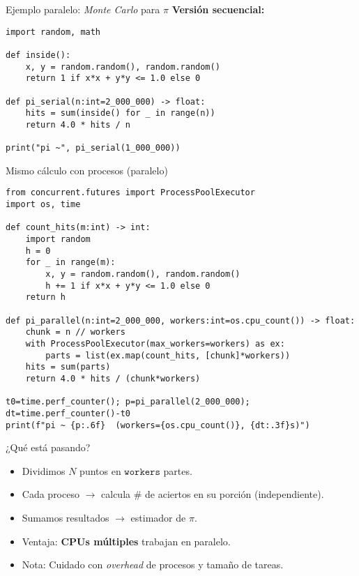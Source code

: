 \documentclass[aspectratio=169,professionalfonts]{beamer}
\begin{document}
\begin{frame}[fragile]{Ejemplo paralelo: \textit{Monte Carlo} para \(\pi\)}
\textbf{Versión secuencial:}
\begin{verbatim}
import random, math

def inside():
    x, y = random.random(), random.random()
    return 1 if x*x + y*y <= 1.0 else 0

def pi_serial(n:int=2_000_000) -> float:
    hits = sum(inside() for _ in range(n))
    return 4.0 * hits / n

print("pi ~", pi_serial(1_000_000))
\end{verbatim}
\end{frame}

\begin{frame}[fragile]{Mismo cálculo con procesos (paralelo)}
\begin{verbatim}
from concurrent.futures import ProcessPoolExecutor
import os, time

def count_hits(m:int) -> int:
    import random
    h = 0
    for _ in range(m):
        x, y = random.random(), random.random()
        h += 1 if x*x + y*y <= 1.0 else 0
    return h

def pi_parallel(n:int=2_000_000, workers:int=os.cpu_count()) -> float:
    chunk = n // workers
    with ProcessPoolExecutor(max_workers=workers) as ex:
        parts = list(ex.map(count_hits, [chunk]*workers))
    hits = sum(parts)
    return 4.0 * hits / (chunk*workers)

t0=time.perf_counter(); p=pi_parallel(2_000_000); dt=time.perf_counter()-t0
print(f"pi ~ {p:.6f}  (workers={os.cpu_count()}, {dt:.3f}s)")
\end{verbatim}
\end{frame}

\begin{frame}{¿Qué está pasando?}
\begin{itemize}
  \item Dividimos \(N\) puntos en \(\texttt{workers}\) partes.
  \item Cada proceso \(\to\) calcula \# de aciertos en su porción (independiente).
  \item Sumamos resultados \(\to\) estimador de \(\pi\).
  \item Ventaja: \textbf{CPUs múltiples} trabajan en paralelo. 
  \item Nota: Cuidado con \textit{overhead} de procesos y tamaño de tareas.
\end{itemize}
\end{frame}
\end{document}
